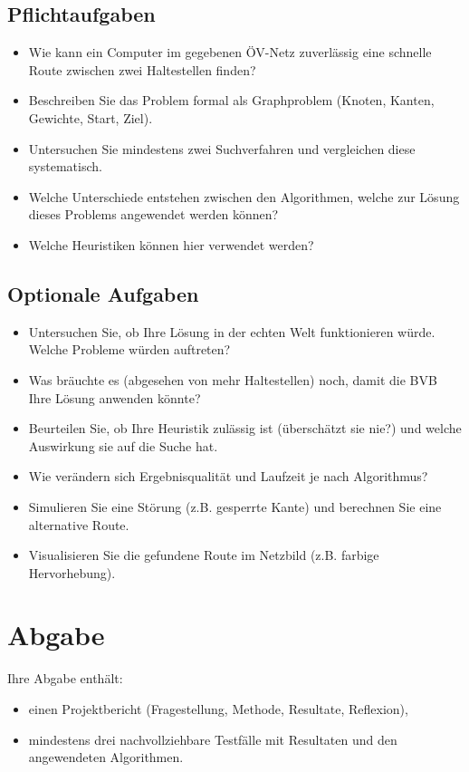 \documentclass[a4paper,11pt,german,notitlepage]{report}
\begin{document}
\subsection*{Pflichtaufgaben}
\begin{itemize}
    \item Wie kann ein Computer im gegebenen ÖV-Netz zuverlässig eine schnelle Route zwischen zwei Haltestellen finden?
    \item Beschreiben Sie das Problem formal als Graphproblem (Knoten, Kanten, Gewichte, Start, Ziel).
    \item Untersuchen Sie mindestens zwei Suchverfahren und vergleichen diese systematisch.
    \item Welche Unterschiede entstehen zwischen den Algorithmen, welche zur Lösung dieses Problems angewendet werden können?
    \item Welche Heuristiken können hier verwendet werden?
\end{itemize}

\subsection*{Optionale Aufgaben}
\begin{itemize}
    \item Untersuchen Sie, ob Ihre Lösung in der echten Welt funktionieren würde. Welche Probleme würden auftreten?
    \item Was bräuchte es (abgesehen von mehr Haltestellen) noch, damit die BVB Ihre Lösung anwenden könnte?
    \item Beurteilen Sie, ob Ihre Heuristik zulässig ist (überschätzt sie nie?) und welche Auswirkung sie auf die Suche hat.
    \item Wie verändern sich Ergebnisqualität und Laufzeit je nach Algorithmus?
    \item Simulieren Sie eine Störung (z.B. gesperrte Kante) und berechnen Sie eine alternative Route.
    \item Visualisieren Sie die gefundene Route im Netzbild (z.B. farbige Hervorhebung).
\end{itemize}

\section*{Abgabe}
Ihre Abgabe enthält:
\begin{itemize}
    \item einen  Projektbericht (Fragestellung, Methode, Resultate, Reflexion),
    \item mindestens drei nachvollziehbare Testfälle mit Resultaten und den angewendeten Algorithmen.
\end{itemize}
\end{document}
